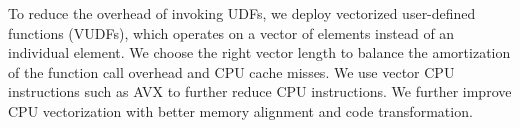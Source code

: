 To reduce the overhead of invoking UDFs, we deploy vectorized user-defined
functions (VUDFs), which operates on a vector of elements instead of
an individual element. We choose the right vector length to balance
the amortization of the function call overhead and CPU cache misses. We use
vector CPU instructions such as AVX \cite{avx} to further reduce CPU
instructions. We further improve CPU vectorization with better memory alignment
and code transformation.


